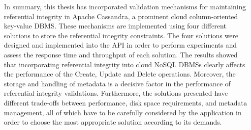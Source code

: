 In summary, this thesis has incorporated validation mechanisms
for maintaining referential integrity  in Apache Cassandra,  a prominent cloud column-oriented
key-value \ac{DBMS}. These mechanisms are implemented using four different
solutions to store the referential integrity constraints. The four
solutions were designed and implemented into the \ac{API} in order to perform
 experiments and assess the response time and throughput of each solution. The
  results showed that incorporating referential integrity into cloud NoSQL
 \acp{DBMS} clearly affects the performance of the Create, Update and Delete
 operations.
  Moreover, the storage and handling of metadata is a decisive factor in the
 performance of referential integrity validations. Furthermore, the solutions
 presented have different trade-offs between performance, disk space requirements, and metadata
management, all of which have to be carefully considered by the  application
in order to choose the most appropriate solution according to its demands. 




% 


